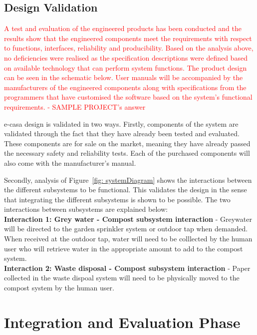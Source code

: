 \documentclass[a4paper,11pt,fleqn]{report}
\begin{document}
\subsection{Design Validation}
\textcolor{red}{A test and evaluation of the engineered products has been conducted and the results show that the engineered components meet the requirements with respect to functions, interfaces, reliability and producibility. Based on the analysis above, no deficiencies were realised as the specification descriptions were defined based on available technology that can perform system functions. The product design can be seen in the schematic below. User manuals will be accompanied by the manufacturers of the engineered components along with specifications from the programmers that have customised the software based on the system’s functional requirements. - SAMPLE PROJECT's answer}

\ac{e-casa} design is validated in two ways. Firstly, components of the system are validated through the fact that they have already been tested and evaluated. These components are for sale on the market, meaning they have already passed the necessary safety and reliability tests. Each of the purchased components will also come with the manufacturer's manual.

Secondly, analysis of Figure~\ref{fig: systemDiagram} shows the interactions between the different subsystems to be functional. This validates the design in the sense that integrating the different subsystems is shown to be possible. The two interactions between subsystems are explained below:\\

\textbf{Interaction 1: Grey water - Compost subsystem interaction} - Greywater will be directed to the garden sprinkler system or outdoor tap when demanded. When received at the outdoor tap, water will need to be colllected by the human user who will retrieve water in the appropriate amount to add to the compost system.\\

\textbf{Interaction 2: Waste disposal - Compost subsystem interaction} - Paper collected in the waste dispoal system will need to be physically moved to the compost system by the human user.

\section{Integration and Evaluation Phase}
\end{document}
